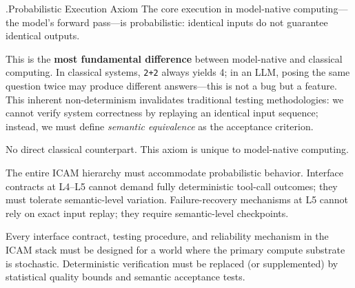 \documentclass[11pt,a4paper]{article}
\newcounter{axiom}[section]
\renewcommand{\theaxiom}{\thesection.\arabic{axiom}}
\begin{document}
\begin{axiombox}{\theaxiom\enspace Probabilistic Execution Axiom}
The core execution in model-native computing---the model's forward pass---is probabilistic: identical inputs do not guarantee identical outputs.
\end{axiombox}
\begin{description}[style=nextline,leftmargin=2em,font=\bfseries]
\item[Intuition] This is the \textbf{most fundamental difference} between model-native and classical computing. In classical systems, \texttt{2+2} always yields 4; in an LLM, posing the same question twice may produce different answers---this is not a bug but a feature. This inherent non-determinism invalidates traditional testing methodologies: we cannot verify system correctness by replaying an identical input sequence; instead, we must define \textit{semantic equivalence} as the acceptance criterion.
\item[Classical source] No direct classical counterpart. This axiom is unique to model-native computing.
\item[ICAM embodiment] The entire ICAM hierarchy must accommodate probabilistic behavior. Interface contracts at L4--L5 cannot demand fully deterministic tool-call outcomes; they must tolerate semantic-level variation. Failure-recovery mechanisms at L5 cannot rely on exact input replay; they require semantic-level checkpoints.
\item[Design implication] Every interface contract, testing procedure, and reliability mechanism in the ICAM stack must be designed for a world where the primary compute substrate is stochastic. Deterministic verification must be replaced (or supplemented) by statistical quality bounds and semantic acceptance tests.
\end{description}
\end{document}
